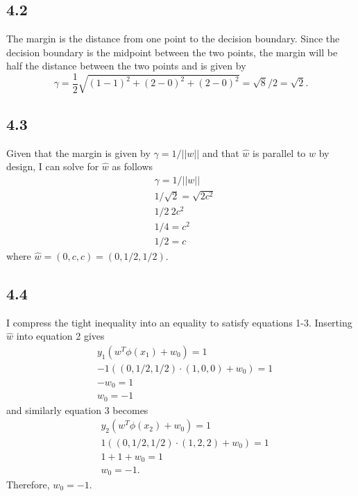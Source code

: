 \documentclass[12pt]{amsart}
\begin{document}
\subsection*{4.2}

The margin is the distance from one point to the decision boundary.  Since the decision boundary is the midpoint between the two points, the margin will be half the distance between the two points and is given by
\begin{equation}
\gamma = \frac{1}{2}\sqrt{(1-1)^2 + (2-0)^2 + (2-0)^2} = \sqrt{8}/2 = \sqrt{2}.
\end{equation}

\subsection*{4.3}

Given that the margin is given by $\gamma = 1/||w||$ and that $\hat{w}$ is parallel to $w$ by design, I can solve for $\hat{w}$ as follows
\begin{equation}
\begin{split}
& \gamma = 1/||w|| \\
& 1/\sqrt{2} = \sqrt{2c^2} \\ 
& 1/2 \ 2c^2 \\
& 1/4 = c^2 \\
& 1/2 = c 
\end{split}
\end{equation}
where $\hat{w} = (0,c,c) = (0,1/2,1/2)$.

\subsection*{4.4}

I compress the tight inequality into an equality to satisfy equations 1-3.  Inserting $\hat{w}$ into equation 2 gives
\begin{equation}
\begin{split}
& y_1(w^T\phi(x_1) + w_0) = 1 \\
& -1((0,1/2,1/2) \cdot (1,0,0) + w_0) = 1 \\
& -w_0 = 1 \\
& w_0 = -1
\end{split}
\end{equation}
and similarly equation 3 becomes 
\begin{equation}
\begin{split}
& y_2(w^T\phi(x_2) + w_0) = 1 \\
& 1((0,1/2,1/2) \cdot (1,2,2) + w_0) = 1 \\
& 1 + 1 + w_0 = 1 \\
& w_0 = -1.
\end{split}
\end{equation}
Therefore, $w_0 = -1$.
\end{document}
